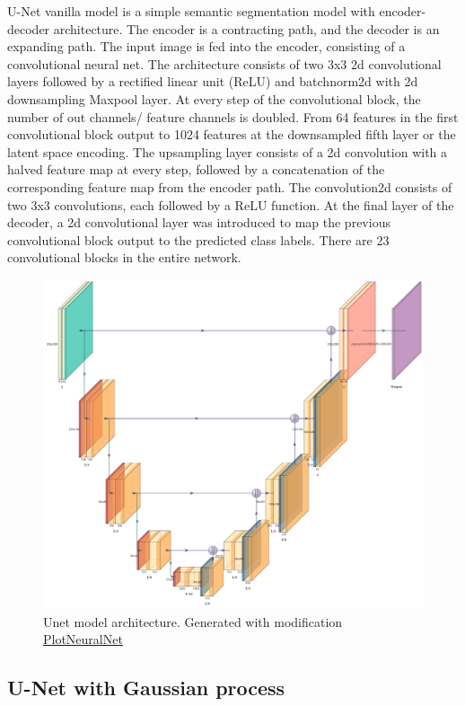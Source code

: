 	U-Net vanilla model is a simple semantic segmentation model with encoder-decoder architecture. The encoder is a contracting path, and the decoder is an expanding path. The input image is fed into the encoder, consisting of a convolutional neural net. The architecture consists of two 3x3 2d convolutional layers followed by a rectified linear unit (ReLU) and batchnorm2d with 2d downsampling Maxpool layer. At every step of the convolutional block, the number of out channels/ feature channels is doubled. From 64 features in the first convolutional block output to 1024 features at the downsampled fifth layer or the latent space encoding. The upsampling layer consists of a 2d convolution with a halved feature map at every step, followed by a concatenation of the corresponding feature map from the encoder path. The convolution2d consists of two 3x3 convolutions, each followed by a ReLU function. At the final layer of the decoder, a 2d convolutional layer was introduced to map the previous convolutional block output to the predicted class labels. There are 23 convolutional blocks in the entire network.    
	
	\begin{figure}
		\centering
		\includegraphics[width=14cm]{images/Unet.jpg}
		\caption{Unet model architecture. Generated with modification \href{https://github.com/HarisIqbal88/PlotNeuralNet}{PlotNeuralNet}}
		\label{fig:unet_model}
	\end{figure}
	
    \subsection{U-Net with Gaussian process}
    
